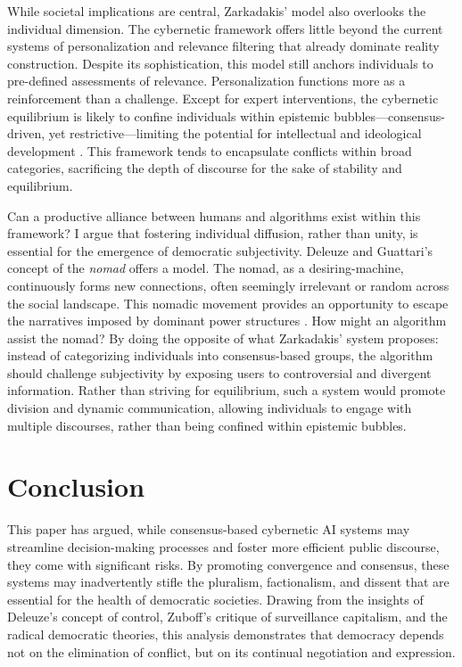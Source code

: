 While societal implications are central, Zarkadakis' model also overlooks the individual dimension. The cybernetic framework offers little beyond the current systems of personalization and relevance filtering that already dominate reality construction. Despite its sophistication, this model still anchors individuals to pre-defined assessments of relevance. Personalization functions more as a reinforcement than a challenge. Except for expert interventions, the cybernetic equilibrium is likely to confine individuals within epistemic bubbles—consensus-driven, yet restrictive—limiting the potential for intellectual and ideological development . This framework tends to encapsulate conflicts within broad categories, sacrificing the depth of discourse for the sake of stability and equilibrium.

Can a productive alliance between humans and algorithms exist within this framework? I argue that fostering individual diffusion, rather than unity, is essential for the emergence of democratic subjectivity. Deleuze and Guattari’s concept of the \textit{nomad} \parencite*{deleuze1983} offers a model. The nomad, as a desiring-machine, continuously forms new connections, often seemingly irrelevant or random across the social landscape. This nomadic movement provides an opportunity to escape the narratives imposed by dominant power structures \parencite[see 148]{deleuze1983}. How might an algorithm assist the nomad? By doing the opposite of what Zarkadakis' system proposes: instead of categorizing individuals into consensus-based groups, the algorithm should challenge subjectivity by exposing users to controversial and divergent information. Rather than striving for equilibrium, such a system would promote division and dynamic communication, allowing individuals to engage with multiple discourses, rather than being confined within epistemic bubbles. 

\chapter{Conclusion}

This paper has argued, while consensus-based cybernetic AI systems may streamline decision-making processes and foster more efficient public discourse, they come with significant risks. By promoting convergence and consensus, these systems may inadvertently stifle the pluralism, factionalism, and dissent that are essential for the health of democratic societies. Drawing from the insights of Deleuze’s concept of control, Zuboff’s critique of surveillance capitalism, and the radical democratic theories, this analysis demonstrates that democracy depends not on the elimination of conflict, but on its continual negotiation and expression.

